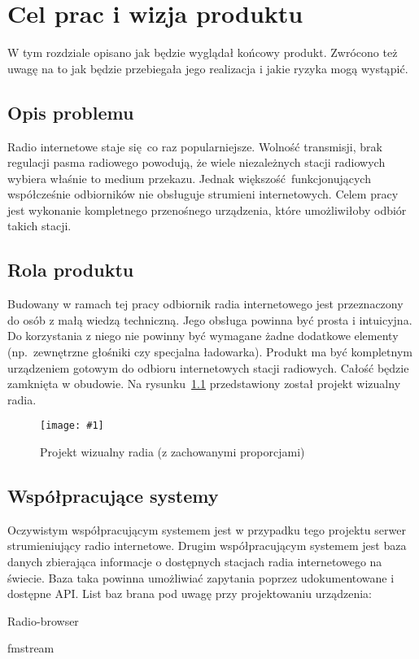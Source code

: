 \documentclass[polish]{aghengthesis}
\author{Norbert Morawski}
\date{\the\year}
\let\tempone\itemize
\let\temptwo\enditemize
\renewenvironment{itemize}{\tempone\setlength{\itemsep}{0cm}}{\temptwo}
\newcommand{\imgint}[4]{
	\begin{figure}[{#4}]
		\centering
		\texttt{[image: \#1]}
		\caption{#2}
		\label{#1}
	\end{figure}
}
\newcommand{\imgh}[3]{\imgint{#1}{#2}{#3}{H}}
\begin{document}
\lstset{inputencoding=utf8, basicstyle=\ttfamily}

\maketitle

\tableofcontents

\chapter{Cel prac i wizja produktu}
	W tym rozdziale opisano jak będzie wyglądał końcowy produkt. Zwrócono też uwagę na to jak będzie przebiegała jego realizacja i jakie ryzyka mogą wystąpić.
	
	\section{Opis problemu}
		Radio internetowe staje się co raz popularniejsze. Wolność transmisji, brak regulacji pasma radiowego powodują, że wiele niezależnych stacji radiowych wybiera właśnie to medium przekazu. Jednak większość funkcjonujących współcześnie odbiorników nie obsługuje strumieni internetowych. Celem pracy jest wykonanie kompletnego przenośnego urządzenia, które umożliwiłoby odbiór takich stacji.
		
	\section{Rola produktu}
		Budowany w ramach  tej pracy odbiornik radia internetowego jest przeznaczony do osób z małą wiedzą techniczną. Jego obsługa powinna być prosta i  intuicyjna. Do korzystania z niego nie powinny być wymagane żadne dodatkowe elementy (np.~zewnętrzne głośniki czy specjalna ładowarka).
		Produkt ma być kompletnym urządzeniem gotowym do odbioru internetowych stacji radiowych. Całość będzie zamknięta w obudowie. Na rysunku~\ref{1/radio_proj_trimmed} przedstawiony został projekt wizualny radia.
		
		\imgh{1/radio_proj_trimmed}{Projekt wizualny radia (z zachowanymi proporcjami)}{0.7}
		
	\section{Współpracujące systemy}
		Oczywistym współpracującym systemem jest w przypadku tego projektu serwer strumieniujący radio internetowe.
		Drugim współpracującym systemem jest baza danych zbierająca informacje o dostępnych stacjach radia internetowego na świecie. Baza taka powinna umożliwiać zapytania poprzez udokumentowane i dostępne API. List baz brana pod uwagę przy projektowaniu urządzenia:
		\begin{itemize}
			\item Radio-browser\textsuperscript{\cite{radio-browser}}
			\item fmstream\textsuperscript{\cite{fmstream}}
		\end{itemize}
		
\end{document}
